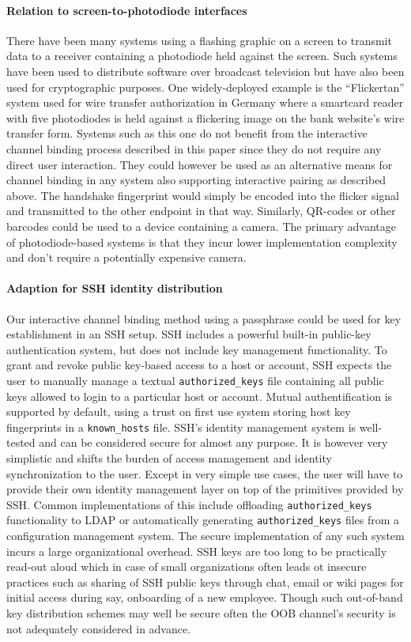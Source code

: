 \documentclass[12pt,a4paper,notitlepage]{article}
\begin{document}
\paragraph{Relation to screen-to-photodiode interfaces}
There have been many systems using a flashing graphic on a screen to transmit data to a receiver containing a photodiode
held against the screen. Such systems have been used to distribute software over broadcast television but have also been
used for cryptographic purposes. One widely-deployed example is the ``Flickertan'' system used for wire transfer
authorization in Germany where a smartcard reader with five photodiodes is held against a flickering image on the bank
website's wire transfer form\cite{schiermeier01,schiermeier02,braun01}. Systems such as this one do not benefit from the
interactive channel binding process described in this paper since they do not require any direct user interaction. They
could however be used as an alternative means for channel binding in any system also supporting interactive pairing as
described above. The handshake fingerprint would simply be encoded into the flicker signal and transmitted to the other
endpoint in that way.  Similarly, QR-codes or other barcodes could be used to a device containing a camera. The primary
advantage of photodiode-based systems is that they incur lower implementation complexity and don't require a potentially
expensive camera.

\paragraph{Adaption for SSH identity distribution}
Our interactive channel binding method using a passphrase could be used for key establishment in an SSH setup.
SSH includes a powerful built-in public-key authentication system, but does not include key management functionality.
To grant and revoke public key-based access to a host or account, SSH expects the user to manually manage a textual
\texttt{authorized\_keys} file containing all public keys allowed to login to a particular host or account. Mutual
authentification is supported by default, using a trust on first use system storing host key fingerprints in a
\texttt{known\_hosts} file. SSH's identity management system is well-tested and can be considered secure for almost any
purpose. It is however very simplistic and shifts the burden of access management and identity synchronization to the
user. Except in very simple use cases, the user will have to provide their own identity management layer on top of the
primitives provided by SSH. Common implementations of this include offloading \texttt{authorized\_keys} functionality to
LDAP or automatically generating \texttt{authorized\_keys} files from a configuration management system. The secure
implementation of any such system incurs a large organizational overhead. SSH keys are too long to be practically
read-out aloud which in case of small organizations often leads ot insecure practices such as sharing of SSH public keys
through chat, email or wiki pages for initial access during say, onboarding of a new employee. Though such out-of-band
key distribution schemes may well be secure often the OOB channel's security is not adequately considered in advance.
\end{document}
